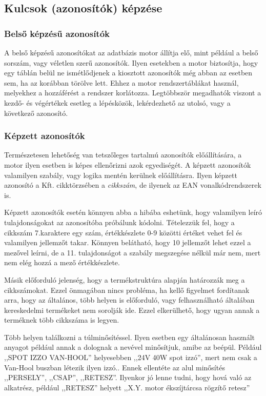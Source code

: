 \documentclass[a4paper,12pt]{report}
\begin{document}
\subsection{Kulcsok (azonosítók) képzése}

\subsubsection{Belső képzésű azonosítók}
A belső képzésű azonosítókat az adatbázis motor állítja elő, mint például a 
belső sorszám, vagy véletlen szerű azonosítók. Ilyen esetekben a motor 
biztosítja, hogy egy táblán belül ne ismétlődjenek a kiosztott azonosítók még 
abban az esetben sem, ha az korábban törölve lett. Ehhez a motor 
rendszertáblákat használ, melyekhez a hozzáférést a rendszer korlátozza. 
Legtöbbször megadhatók viszont a kezdő- és végértékek esetleg a lépésközök, 
lekérdezhető az utolsó, vagy a következő azonosító.

\subsubsection{Képzett azonosítók}
Természetesen lehetőség van tetszőleges tartalmú azonosítók előállítására, a 
motor ilyen esetben is képes ellenőrizni azok egyediségét. A képzett azonosítók 
valamilyen szabály, vagy logika mentén kerülnek előállításra. Ilyen képzett 
azonosító a Kft. cikktörzsében a \textit{cikkszám}, de ilyenek az EAN 
vonalkódrendszerek is.

Képzett azonosítók esetén könnyen abba a hibába eshetünk, hogy valamilyen leíró
tulajdonságokat az azonosítóba próbálunk kódolni.
Tételezzük fel, hogy a cikkszám 7.karaktere egy szám, értékkészlete 0-9 közötti értéket vehet fel és valamilyen jellemzőt takar. Könnyen belátható, hogy 10 jellemzőt lehet ezzel a mezővel leírni, de a 11. tulajdonságot a szabály megszegése nélkül már nem, mert nem elég hozzá a mező értékkészlete.

Másik előforduló jelenség, hogy a termékstruktúra alapján határozzák meg a 
cikkszámokat. Ezzel önmagában nincs probléma, ha kellő figyelmet fordítanak 
arra, hogy az általános, több helyen is előforduló, vagy felhasználható 
általában kereskedelmi termékeket nem sorolják ide. Ezzel elkerülhető, 
hogy ugyan annak a terméknek több cikkszáma is legyen.

Több helyen találkozni a túlminősítéssel. Ilyen esetben egy általánosan használt anyagot például annak a dolognak a nevével minősítjuk, amibe az beépül. Például ,,SPOT IZZO VAN-HOOL'' helyesebben ,,24V 40W spot izzó'', mert nem csak a Van-Hool buszban létezik ilyen izzó.. Ennek ellentéte az alul minősítés ,,PERSELY'', ,,CSAP'', ,,RETESZ''. Ilyenkor jó lenne tudni, hogy hová való az alkatrész, például ,,RETESZ'' helyett ,,X.Y. motor ékszíjtárcsa rögzítő retesz''
\end{document}
